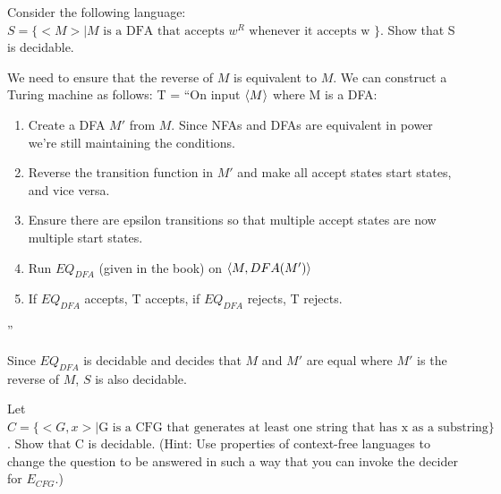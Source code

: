 \begin{problem}{3}
  Consider the following language: $S = \{<M> | M \text{ is a DFA that accepts } w^R \text{ whenever it accepts w }\}$. Show that S is
  decidable.
  \begin{solution}
    We need to ensure that the reverse of $M$ is equivalent to $M$. We can construct a Turing machine as follows:
    T = ``On input $\left \langle M \right \rangle $ where M is a DFA:
    \begin{enumerate}
      \item Create a DFA $M'$ from $M$. Since NFAs and DFAs are equivalent in power we're still maintaining the conditions.\\
      \item Reverse the transition function in $M'$ and make all accept states start states, and vice versa.\\
      \item Ensure there are epsilon transitions so that multiple accept states are now multiple start states.\\
      \item Run $EQ_{DFA}$ (given in the book) on $\left \langle M, DFA(M') \right \rangle $\\
      \item If $EQ_{DFA}$ accepts, T accepts, if $EQ_{DFA}$ rejects, T rejects.\\
    \end{enumerate}
    ''

    \noindent Since $EQ_{DFA}$ is decidable and decides that $M$ and $M'$ are equal where $M'$ is the reverse of $M$, $S$ is also
    decidable.
  \end{solution}
\end{problem}

\begin{problem}{4}
  Let $C = \{<G,x> | \text{G is a CFG that generates at least one string that has x as a substring}\}$. Show that C is decidable.
  (Hint: Use properties of context-free languages to change the question to be answered in such a way that you can
  invoke the decider for $E_{CFG}$.)
\end{problem}

